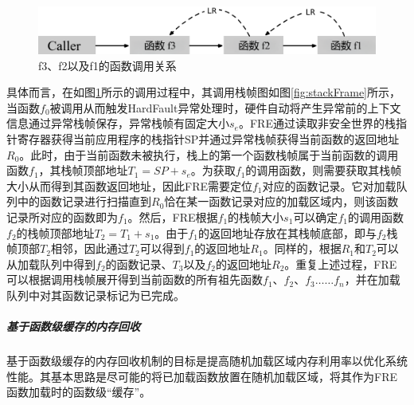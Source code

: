 \documentclass[UTF8,12pt,a4paper,twoside]{ctexart}
\numberwithin{figure}{section}
\begin{document}
\begin{figure}[H]
    \centering
    \includegraphics[scale=0.35]{graph/funcCall.png}
    \caption{f3、f2以及f1的函数调用关系}
    \label{fig:funcCall}
\end{figure}
\par 具体而言，在如图\ref{fig:funcCall}所示的调用过程中，其调用栈帧图如图\ref{fig:stackFrame}所示，当函数$f_0$被调用从而触发HardFault异常处理时，硬件自动将产生异常前的上下文信息通过异常栈帧保存，异常栈帧有固定大小$s_e$。FRE通过读取非安全世界的栈指针寄存器获得当前应用程序的栈指针SP并通过异常栈帧获得当前函数的返回地址$R_0$。此时，由于当前函数未被执行，栈上的第一个函数栈帧属于当前函数的调用函数$f_1$，其栈帧顶部地址$T_1=SP+s_e$。为获取$f_1$的调用函数，则需要获取其栈帧大小从而得到其函数返回地址，因此FRE需要定位$f_1$对应的函数记录。它对加载队列中的函数记录进行扫描直到$R_0$恰在某一函数记录对应的加载区域内，则该函数记录所对应的函数即为$f_1$。然后，FRE根据$f_1$的栈帧大小$s_1$可以确定$f_1$的调用函数$f_2$的栈帧顶部地址$T_2=T_1+s_1$。由于$f_1$的返回地址存放在其栈帧底部，即与$f_2$栈帧顶部$T_2$相邻，因此通过$T_2$可以得到$f_1$的返回地址$R_1$。同样的，根据$R_1$和$T_2$可以从加载队列中得到$f_2$的函数记录、$T_3$以及$f_2$的返回地址$R_2$。重复上述过程，FRE可以根据调用栈帧展开得到当前函数的所有祖先函数$f_1、f_2、f_3……f_n$，并在加载队列中对其函数记录标记为已完成。
\subparagraph{基于函数级缓存的内存回收}
\par 基于函数级缓存的内存回收机制的目标是提高随机加载区域内存利用率以优化系统性能。其基本思路是尽可能的将已加载函数放置在随机加载区域，将其作为FRE函数加载时的函数级“缓存”。
\end{document}
